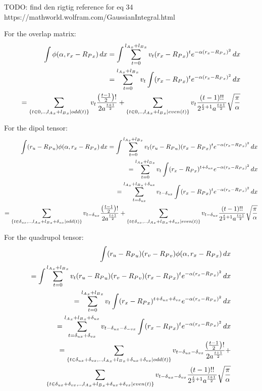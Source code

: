 TODO: find den rigtig reference for eq 34 https://mathworld.wolfram.com/GaussianIntegral.html

For the overlap matrix:
\begin{align}
    \int \phi(\alpha,r_x-{R_P}_x)\,dx = \int \sum_{t=0}^{{l_A}_x+{l_B}_x}v_t(r_x-{R_P}_x)^te^{-\alpha(r_x-{R_P}_x)^2}\,dx\\
        =  \sum_{t=0}^{{l_A}_x+{l_B}_x}v_t\int(r_x-{R_P}_x)^{t}e^{-\alpha(r_x-{R_P}_x)^2}\,dx\notag\\
        =  \sum_{\{t\in0,..,{l_A}_x+{l_B}_x | odd(t)\}}v_{t}\frac{\left(\frac{t-1}{2}\right)!}{2a^{\frac{t+1}{2}}}+
        \sum_{\{t\in0,..,{l_A}_x+{l_B}_x | even(t)\}}v_{t}\frac{\left(t-1\right)!!}{2^{\frac{t}{2}+1}a^{\frac{t+1}{2}}}\sqrt{\frac{\pi}{\alpha}}\notag
\end{align}

For the dipol tensor:
\begin{align}
    \int (r_u-{R_P}_u)\phi(\alpha,r_x-{R_P}_x)\,dx = \int \sum_{t=0}^{{l_A}_x+{l_B}_x}v_t(r_u-{R_P}_u)(r_x-{R_P}_x)^te^{-\alpha(r_x-{R_P}_x)^2}\,dx\\
        =  \sum_{t=0}^{{l_A}_x+{l_B}_x}v_t\int(r_x-{R_P}_x)^{t+\delta_{ux}}e^{-\alpha(r_x-{R_P}_x)^2}\,dx\notag\\
        =  \sum_{t=\delta_{ux}}^{{l_A}_x+{l_B}_x+\delta_{ux}}v_{t-\delta_{ux}}\int(r_x-{R_P}_x)^{t}e^{-\alpha(r_x-{R_P}_x)^2}\,dx\notag\\
        =  \sum_{\{t\in\delta_{ux},..,{l_A}_x+{l_B}_x+\delta_{ux} | odd(t)\}}v_{t-\delta_{ux}}\frac{\left(\frac{t-1}{2}\right)!}{2a^{\frac{t+1}{2}}}+
        \sum_{\{t\in\delta_{ux},..,{l_A}_x+{l_B}_x+\delta_{ux} | even(t)\}}v_{t-\delta_{ux}}\frac{\left(t-1\right)!!}{2^{\frac{t}{2}+1}a^{\frac{t+1}{2}}}\sqrt{\frac{\pi}{\alpha}}\notag
\end{align}

For the quadrupol tensor:
\begin{align}
    \int (r_u-{R_P}_u)(r_v-{R_P}_v)\phi(\alpha,r_x-{R_P}_x)\,dx \\
    = \int \sum_{t=0}^{{l_A}_x+{l_B}_x}v_t(r_u-{R_P}_u)(r_v-{R_P}_v)(r_x-{R_P}_x)^te^{-\alpha(r_x-{R_P}_x)^2}\,dx\notag\\
        =  \sum_{t=0}^{{l_A}_x+{l_B}_x}v_t\int(r_x-{R_P}_x)^{t+\delta_{ux}+\delta_{vx}}e^{-\alpha(r_x-{R_P}_x)^2}\,dx\notag\\
        =  \sum_{t=\delta_{ux}+\delta_{vx}}^{{l_A}_x+{l_B}_x+\delta_{ux}}v_{t-\delta_{ux}-\delta_{-vx}}\int(r_x-{R_P}_x)^{t}e^{-\alpha(r_x-{R_P}_x)^2}\,dx\notag\\
        =  \sum_{\{t\in\delta_{ux}+\delta_{vx},..,{l_A}_x+{l_B}_x+\delta_{ux}+\delta_{vx} | odd(t)\}}v_{t-\delta_{ux}-\delta_{vx}}\frac{\left(\frac{t-1}{2}\right)!}{2a^{\frac{t+1}{2}}}+\notag\\
        \sum_{\{t\in\delta_{ux}+\delta_{vx},..,{l_A}_x+{l_B}_x+\delta_{ux}+\delta_{vx} | even(t)\}}v_{t-\delta_{ux}-\delta_{vx}}\frac{\left(t-1\right)!!}{2^{\frac{t}{2}+1}a^{\frac{t+1}{2}}}\sqrt{\frac{\pi}{\alpha}}\notag
\end{align}

